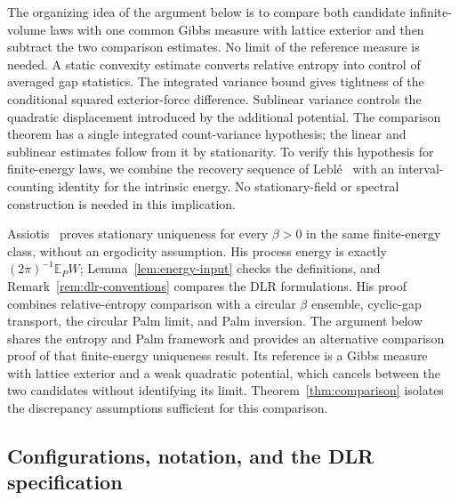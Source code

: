 \documentclass[11pt,reqno]{amsart}
\numberwithin{equation}{section}
\theoremstyle{definition}
\theoremstyle{remark}
\newcommand{\E}{\mathbb E}
\newcommand{\1}{\mathbf 1}
\begin{document}
The organizing idea of the argument below is to compare both candidate
infinite-volume laws with one common Gibbs measure with lattice exterior and then
subtract the two comparison estimates. No limit of the reference measure is needed. A static
convexity estimate converts relative entropy into control of averaged
gap statistics. The integrated variance bound gives tightness of the conditional squared
exterior-force difference. Sublinear variance controls the quadratic
displacement introduced by the additional potential. The comparison theorem
has a single integrated count-variance hypothesis; the linear and
sublinear estimates follow from it by stationarity. To verify this
hypothesis for finite-energy laws, we combine the recovery sequence of
Lebl\'e~\cite[Proposition~5.3]{Leble} with an interval-counting identity
for the intrinsic energy. No stationary-field or spectral construction
is needed in this implication.

Assiotis~\cite[Theorem~1.1]{Assiotis} proves stationary uniqueness for
every $\beta>0$ in the same finite-energy class, without an ergodicity
assumption. His process energy is exactly $(2\pi)^{-1}\E_PW$;
Lemma~\ref{lem:energy-input} checks the definitions, and
Remark~\ref{rem:dlr-conventions} compares the DLR formulations.
His proof combines relative-entropy comparison with a circular
$\beta$ ensemble, cyclic-gap transport, the circular Palm limit,
and Palm inversion. The argument below shares the entropy and Palm
framework and provides an alternative comparison proof of that
finite-energy uniqueness result. Its reference is a Gibbs measure with lattice exterior
and a weak quadratic potential, which cancels between the two
candidates without identifying its limit. Theorem~\ref{thm:comparison}
isolates the discrepancy assumptions sufficient for this comparison.

\subsection{Configurations, notation, and the DLR specification}
\label{subsec:notation}
\end{document}
